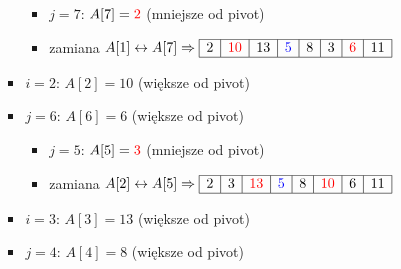 \documentclass[11pt,a4paper]{article}
\begin{document}
\begin{itemize}
\begin{enumerate}
\begin{itemize}
\begin{itemize}
                            \item $j = 7$: $A[7] = \textcolor{red}{2}$ (mniejsze od pivot)
                            \item zamiana $A[1] \leftrightarrow A[7] \Rightarrow \\
                            \begin{array}{|c|c|c|c|c|c|c|c|}
                            \hline
                            2 & \textcolor{red}{10} & 13 & \textcolor{blue}{5} & 8 & 3 & \textcolor{red}{6} & 11 \\
                            \hline
                            \end{array}$
                        \end{itemize}
                    \item $i = 2$: $A[2] = 10$ (większe od pivot)
                    \item $j = 6$: $A[6] = 6$ (większe od pivot)
                        \begin{itemize}
                            \item $j = 5$: $A[5] = \textcolor{red}{3}$ (mniejsze od pivot)
                            \item zamiana $A[2] \leftrightarrow A[5] \Rightarrow \\
                            \begin{array}{|c|c|c|c|c|c|c|c|}
                            \hline
                            2 & 3 & \textcolor{red}{13} & \textcolor{blue}{5} & 8 & \textcolor{red}{10} & 6 & 11 \\
                            \hline
                            \end{array}$
                        \end{itemize}
                    \item $i = 3$: $A[3] = 13$ (większe od pivot)
                    \item $j = 4$: $A[4] = 8$ (większe od pivot)
\end{itemize}
\end{enumerate}
\end{itemize}
\end{document}
